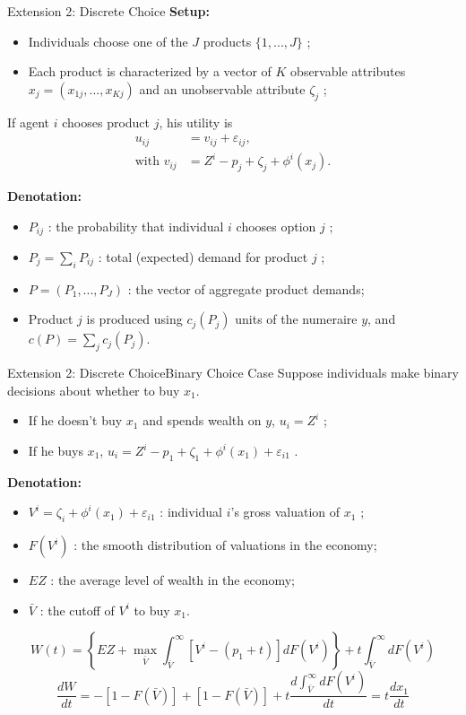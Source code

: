 \documentclass{beamer}
\begin{document}
\begin{frame}{Extension 2: Discrete Choice}
	\textbf{Setup:}
	\begin{itemize}
		\item Individuals choose one of the $J$ products $\{1,...,J\}$ ;
		\item Each product is characterized by a vector of $K$ observable attributes $x_j=(x_{1j},...,x_{Kj})$ and an unobservable attribute $\zeta_j$ ;
	\end{itemize}
	If agent $i$ chooses product $j$, his utility is
	\begin{equation}
		\begin{aligned}
			u_{ij} &= v_{ij} + \varepsilon_{ij}, \\
			\mbox{with } v_{ij} &= Z^i - p_j + \zeta_j + \phi^i(x_j).
		\end{aligned}
	\end{equation}

	\textbf{Denotation:}
	\begin{itemize}
		\item $P_{ij}$ : the probability that individual $i$ chooses option $j$ ;
		\item $P_j=\sum_i P_{ij}$ : total (expected) demand for product $j$ ;
		\item $P=(P_1,...,P_J)$ : the vector of aggregate product demands;
		\item Product $j$ is produced using $c_j(P_j)$ units of the numeraire $y$, and $c(P)=\sum_j c_j(P_j)$.
	\end{itemize}
\end{frame}
\begin{frame}{Extension 2: Discrete Choice}{Binary Choice Case}
	Suppose individuals make binary decisions about whether to buy $x_1$.
	\begin{itemize}
		\item If he doesn't buy $x_1$ and spends wealth on $y$, $u_i = Z^i$ ;
		\item If he buys $x_1$, $u_i=Z^i-p_1+\zeta_1+\phi^i(x_1)+\varepsilon_{i1}$ .
	\end{itemize}
	\textbf{Denotation:}
	\begin{itemize}
		\item $V^i=\zeta_i+\phi^i(x_1)+\varepsilon_{i1}$ : individual $i$'s gross valuation of $x_1$ ;
		\item $F(V^i)$ : the smooth distribution of valuations in the economy;
		\item $EZ$ : the average level of wealth in the economy;
		\item $\bar{V}$ : the cutoff of $V^i$ to buy $x_1$.
	\end{itemize}
	\begin{equation}
		W(t) = \left\{EZ + \max_{\bar{V}}\int_{\bar{V}}^\infty\left[V^i-(p_1+t)\right]dF(V^i)\right\} + t\int_{\bar{V}}^\infty dF(V^i)
	\end{equation}
	\begin{equation}
		\frac{dW}{dt} = -\left[1-F(\bar{V})\right] + \left[1-F(\bar{V})\right] + t\frac{d\int_{\bar{V}}^\infty dF(V^i)}{dt} = t\frac{dx_1}{dt}
	\end{equation}
\end{frame}
\end{document}
